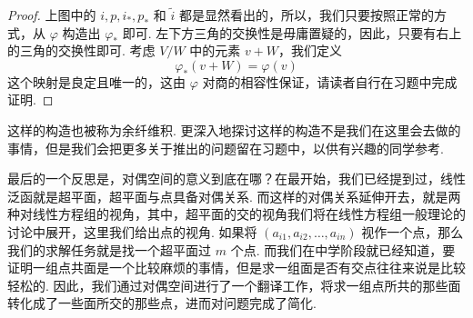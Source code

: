 \begin{proof}
    上图中的 $i, p, i_*, p_*$ 和 $\tilde{i}$ 都是显然看出的，所以，我们只要按照正常的方式，从 $\varphi$ 构造出 $\varphi_*$ 即可. 左下方三角的交换性是毋庸置疑的，因此，只要有右上的三角的交换性即可. 考虑 $V/W$ 中的元素 $v + W$，我们定义
    \[ \varphi_*(v + W) = \varphi(v) \]
    这个映射是良定且唯一的，这由 $\varphi$ 对商的相容性保证，请读者自行在习题中完成证明.
\end{proof}

这样的构造也被称为余纤维积. 更深入地探讨这样的构造不是我们在这里会去做的事情，但是我们会把更多关于推出的问题留在习题中，以供有兴趣的同学参考.

最后的一个反思是，对偶空间的意义到底在哪？在最开始，我们已经提到过，线性泛函就是超平面，超平面与点具备对偶关系. 而这样的对偶关系延伸开去，就是两种对线性方程组的视角，其中，超平面的交的视角我们将在线性方程组一般理论的讨论中展开，这里我们给出点的视角. 如果将 $(a_{i1}, a_{i2},\ldots, a_{in})$ 视作一个点，那么我们的求解任务就是找一个超平面过 $m$ 个点. 而我们在中学阶段就已经知道，要证明一组点共面是一个比较麻烦的事情，但是求一组面是否有交点往往来说是比较轻松的. 因此，我们通过对偶空间进行了一个翻译工作，将求一组点所共的那些面转化成了一些面所交的那些点，进而对问题完成了简化.

\begin{summary}

\end{summary}

